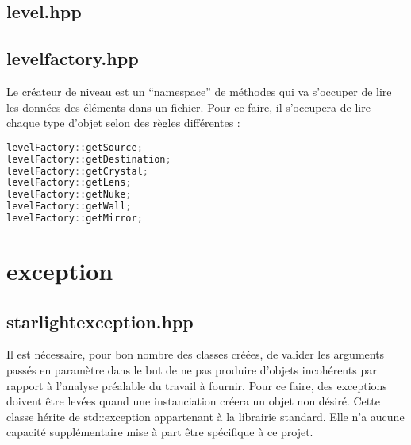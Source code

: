 \documentclass[a4paper,11pt]{report}
\begin{document}
\subsection[Niveau]{level.hpp}
\subsection[Createur de niveau]{levelfactory.hpp}
Le créateur de niveau est un ``namespace'' de méthodes qui va s'occuper de lire
les données des éléments dans un fichier. 
Pour ce faire, il s'occupera de lire chaque type d'objet selon des règles
différentes :
\begin{lstlisting}[frame=single,language=C++]
levelFactory::getSource;
levelFactory::getDestination;
levelFactory::getCrystal;
levelFactory::getLens;
levelFactory::getNuke;
levelFactory::getWall;
levelFactory::getMirror;
\end{lstlisting}
\section[L'exception]{exception}
\subsection[Exception Starlight]{starlightexception.hpp}
Il est nécessaire, pour bon nombre des classes créées, de valider les arguments passés en
paramètre dans le but de ne pas produire d'objets incohérents par rapport à
l'analyse préalable du travail à fournir. Pour ce faire, des exceptions doivent
être levées quand une instanciation créera un objet non désiré. 
Cette classe hérite de std::exception appartenant à la librairie standard. Elle n'a aucune
capacité supplémentaire mise à part être spécifique à ce projet. \\ \\
\end{document}
